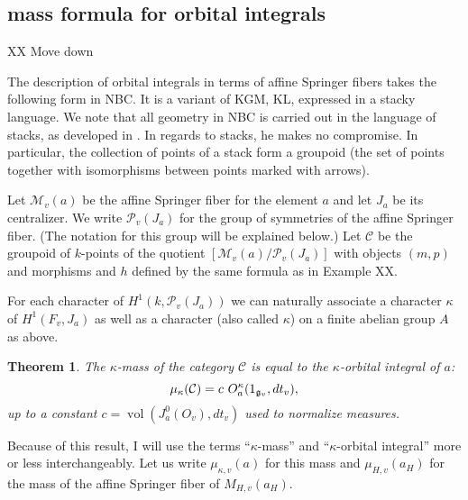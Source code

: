 \documentclass[brochure,english,12pt]{bourbaki}
\newtheorem{example}[equation]{Example}
\newtheorem{theorem}[equation]{Theorem}
\def\op#1{{\operatorname{#1}}}
\def\g{\frak{g}}
\def\C{{\mathcal C}}
\def\M{{\mathcal M}}
\def\P{{\mathcal P}}
\begin{document}


\subsection{mass formula for orbital integrals}

XX Move down

The description of orbital integrals in terms of affine Springer
fibers takes the following form in NBC.  It is a variant of KGM, KL,
expressed in a stacky language.  We note that all geometry in NBC is
carried out in the language of stacks, as developed in
\cite{Laumon-MB}.  In regards to stacks, he makes no compromise.  In
particular, the collection of points of a stack form a groupoid (the
set of points together with isomorphisms between points marked with
arrows).

Let $\M_v(a)$ be the affine Springer fiber for the element $a$ and let
$J_a$ be its centralizer.  We write $\P_v(J_a)$ for the group of
symmetries of the affine Springer fiber.  (The notation for this group
will be explained below.)  Let $\C$ be the groupoid of $k$-points of
the quotient $[\M_v(a)/\P_v(J_a)]$ with objects $(m,p)$ and morphisms
and $h$ defined by the same formula as in Example XX.

For each character of $H^1(k,\P_v(J_a))$ we can naturally associate a
character $\kappa$ of $H^1(F_v,J_a)$ as well as a character (also
called $\kappa$) on a finite abelian group $A$ as above.

\begin{theorem}
The $\kappa$-mass of the category $\C$ is equal to the
$\kappa$-orbital integral of $a$:
\[
\mu_\kappa(\C) = c\,\, O^\kappa_a(1_{\g_v},dt_v),
\]
up to a constant $c=\op{vol}(J^0_a(O_v),dt_v)$ used to normalize measures.
\end{theorem}

Because of this result, I will use the terms ``$\kappa$-mass'' and
``$\kappa$-orbital integral'' more or less interchangeably.  Let us
write $\mu_{\kappa,v}(a)$ for this mass and $\mu_{H,v}(a_H)$ for the
mass of the affine Springer fiber of $M_{H,v}(a_H)$.
\end{document}
